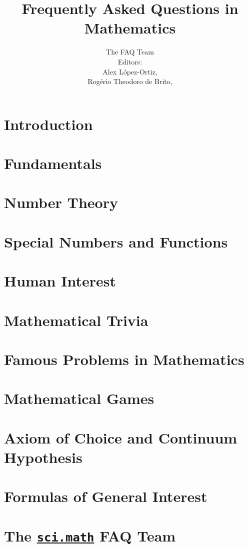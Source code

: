 \documentclass[a4paper]{report}
\title{Frequently Asked Questions in Mathematics}
\author{The \scimath FAQ Team\\
  \bigskip
  {\small Editors:}\\
  \bigskip
  {\small Alex L\'{o}pez-Ortiz, \emailalopez}\\
  {\small Rog\'{e}rio Theodoro de Brito, \emailrbrito}
}
\newcommand{\scimath}{\href{news://sci.math}{\texttt{sci.math}}\xspace}
\begin{document}
\maketitle
\tableofcontents

\chapter{Introduction}
  
\chapter{Fundamentals}
  
  
  
  
\chapter{Number Theory}
  
  
\chapter{Special Numbers and Functions}
  
  
  
  
  
  
\chapter{Human Interest}
  
  
  
  
  
  
\chapter{Mathematical Trivia}
  
\chapter{Famous Problems in Mathematics}
  
  
  
  
\chapter{Mathematical Games}
  
\chapter{Axiom of Choice and Continuum Hypothesis}
  
  
  
\chapter{Formulas of General Interest}
  
  
  
  
\chapter{The \scimath FAQ Team}
  

\cleardoublepage
{}
{}
\nocite{*}


\end{document}
